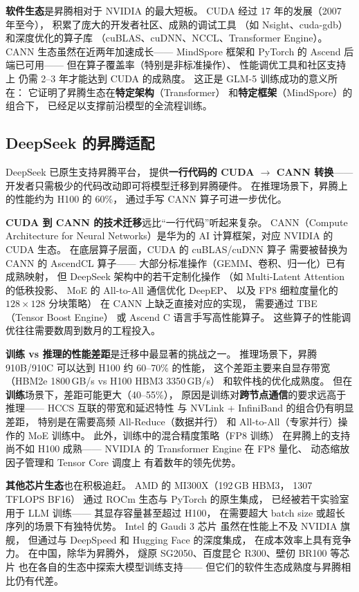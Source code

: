 \textbf{软件生态}是昇腾相对于 NVIDIA 的最大短板。
CUDA 经过 17 年的发展（2007 年至今），
积累了庞大的开发者社区、成熟的调试工具
（如 Nsight、cuda-gdb）和深度优化的算子库
（cuBLAS、cuDNN、NCCL、Transformer Engine）。
CANN 生态虽然在近两年加速成长——
MindSpore 框架和 PyTorch 的 Ascend 后端已可用——
但在算子覆盖率（特别是非标准操作）、
性能调优工具和社区支持上
仍需 2--3 年才能达到 CUDA 的成熟度。
这正是 GLM-5 训练成功的意义所在：
它证明了昇腾生态在\textbf{特定架构}（Transformer）
和\textbf{特定框架}（MindSpore）的组合下，
已经足以支撑前沿模型的全流程训练。

\subsection{DeepSeek 的昇腾适配}

DeepSeek 已原生支持昇腾平台，
提供\textbf{一行代码的 CUDA $\to$ CANN 转换}——
开发者只需极少的代码改动即可将模型迁移到昇腾硬件。
在推理场景下，昇腾上的性能约为 H100 的 60\%，
通过手写 CANN 算子可进一步优化。

\textbf{CUDA 到 CANN 的技术迁移}远比``一行代码''听起来复杂。
CANN（Compute Architecture for Neural Networks）是华为的
AI 计算框架，对应 NVIDIA 的 CUDA 生态。
在底层算子层面，CUDA 的 cuBLAS/cuDNN 算子
需要被替换为 CANN 的 AscendCL 算子——
大部分标准操作（GEMM、卷积、归一化）已有成熟映射，
但 DeepSeek 架构中的若干定制化操作
（如 Multi-Latent Attention 的低秩投影、
MoE 的 All-to-All 通信优化 DeepEP、
以及 FP8 细粒度量化的 $128 \times 128$ 分块策略）
在 CANN 上缺乏直接对应的实现，
需要通过 TBE（Tensor Boost Engine）
或 Ascend C 语言手写高性能算子。
这些算子的性能调优往往需要数周到数月的工程投入。

\textbf{训练 vs 推理的性能差距}是迁移中最显著的挑战之一。
推理场景下，昇腾 910B/910C 可以达到 H100 约 60--70\% 的性能，
这个差距主要来自显存带宽
（HBM2e 1800\,GB/s vs H100 HBM3 3350\,GB/s）
和软件栈的优化成熟度。
但在\textbf{训练}场景下，差距可能更大（40--55\%），
原因是训练对\textbf{跨节点通信}的要求远高于推理——
HCCS 互联的带宽和延迟特性
与 NVLink + InfiniBand 的组合仍有明显差距，
特别是在需要高频 All-Reduce（数据并行）
和 All-to-All（专家并行）操作的 MoE 训练中。
此外，训练中的混合精度策略（FP8 训练）
在昇腾上的支持尚不如 H100 成熟——
NVIDIA 的 Transformer Engine 在 FP8 量化、
动态缩放因子管理和 Tensor Core 调度上
有着数年的领先优势。

\textbf{其他芯片生态}也在积极追赶。
AMD 的 MI300X（192\,GB HBM3，
1307 TFLOPS BF16）
通过 ROCm 生态与 PyTorch 的原生集成，
已经被若干实验室用于 LLM 训练——
其显存容量甚至超过 H100，
在需要超大 batch size 或超长序列的场景下有独特优势。
Intel 的 Gaudi 3 芯片
虽然在性能上不及 NVIDIA 旗舰，
但通过与 DeepSpeed 和 Hugging Face 的深度集成，
在成本效率上具有竞争力。
在中国，除华为昇腾外，
燧原 SG2050、百度昆仑 R300、壁仞 BR100 等芯片
也在各自的生态中探索大模型训练支持——
但它们的软件生态成熟度与昇腾相比仍有代差。


